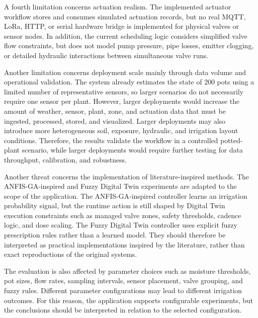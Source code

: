 \par A fourth limitation concerns actuation realism. The implemented actuator workflow
    stores and consumes simulated actuation records, but no real MQTT, LoRa, HTTP, or
    serial hardware bridge is implemented for physical valves or sensor nodes. In
    addition, the current scheduling logic considers simplified valve flow constraints,
    but does not model pump pressure, pipe losses, emitter clogging, or detailed hydraulic
    interactions between simultaneous valve runs.

\par Another limitation concerns deployment scale mainly through data volume and
    operational validation. The system already estimates the state of 200 pots using a
    limited number of representative sensors, so larger scenarios do not necessarily
    require one sensor per plant. However, larger deployments would increase the amount of
    weather, sensor, plant, zone, and actuation data that must be ingested, processed,
    stored, and visualized. Larger deployments may also introduce more heterogeneous soil,
    exposure, hydraulic, and irrigation layout conditions. Therefore, the results validate
    the workflow in a controlled potted-plant scenario, while larger deployments would
    require further testing for data throughput, calibration, and robustness.

\par Another threat concerns the implementation of literature-inspired methods. The
    ANFIS-GA-inspired and Fuzzy Digital Twin experiments are adapted to the scope of the
    application. The ANFIS-GA-inspired controller learns an irrigation probability signal,
    but the runtime action is still shaped by Digital Twin execution constraints such as
    managed valve zones, safety thresholds, cadence logic, and dose scaling. The Fuzzy
    Digital Twin controller uses explicit fuzzy prescription rules rather than a learned
    model. They should therefore be interpreted as practical implementations inspired by
    the literature, rather than exact reproductions of the original systems.

\par The evaluation is also affected by parameter choices such as moisture thresholds, pot
    sizes, flow rates, sampling intervals, sensor placement, valve grouping, and fuzzy
    rules. Different parameter configurations may lead to different irrigation outcomes.
    For this reason, the application supports configurable experiments, but the
    conclusions should be interpreted in relation to the selected configuration.

